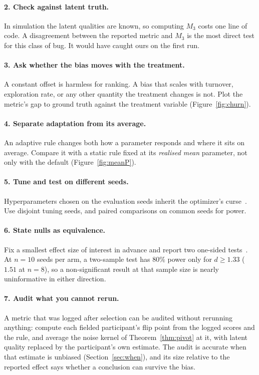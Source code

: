 \documentclass[sigconf,anonymous,review,nonacm]{acmart}
\begin{document}
\paragraph{2. Check against latent truth.} In simulation the latent qualities are known,
so computing $M_3$ costs one line of code. A disagreement between the reported metric and
$M_3$ is the most direct test for this class of bug. It would have caught ours on the
first run.

\paragraph{3. Ask whether the bias moves with the treatment.} A constant offset is
harmless for ranking. A bias that scales with turnover, exploration rate, or any other
quantity the treatment changes is not. Plot the metric's gap to ground truth against the
treatment variable (Figure~\ref{fig:churn}).

\paragraph{4. Separate adaptation from its average.} An adaptive rule changes both how a
parameter responds and where it sits on average. Compare it with a static rule fixed at
its \emph{realised mean} parameter, not only with the default (Figure~\ref{fig:meanP}).

\paragraph{5. Tune and test on different seeds.} Hyperparameters chosen on the evaluation
seeds inherit the optimizer's curse~\cite{smith2006optimizer,cawley2010overfitting}. Use
disjoint tuning seeds, and paired comparisons on common seeds for power.

\paragraph{6. State nulls as equivalence.} Fix a smallest effect size of interest in
advance and report two one-sided tests~\cite{lakens2017equivalence}. At $n=10$ seeds per
arm, a two-sample test has $80\%$ power only for $d\ge1.33$ ($1.51$ at $n=8$), so a non-significant
result at that sample size is nearly uninformative in either direction.

\paragraph{7. Audit what you cannot rerun.} A metric that was logged after selection can be
audited without rerunning anything: compute each fielded participant's flip point from the
logged scores and the rule, and average the noise kernel of Theorem~\ref{thm:pivot} at it,
with latent quality replaced by the participant's own estimate. The audit is accurate when
that estimate is unbiased (Section~\ref{sec:when}), and its size relative to the reported
effect says whether a conclusion can survive the bias.
\end{document}
